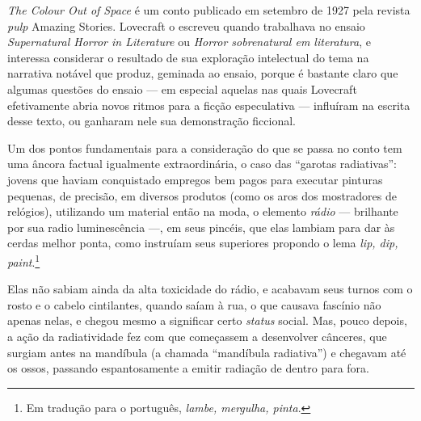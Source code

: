 \textit{The Colour Out of Space} é um conto publicado em setembro de 1927
pela revista \textit{pulp} Amazing Stories. Lovecraft o escreveu quando
trabalhava no ensaio \textit{Supernatural Horror in Literature} ou \textit{Horror
sobrenatural em literatura}, e interessa considerar o resultado de sua
exploração intelectual do tema na narrativa notável que produz, geminada
ao ensaio, porque é bastante claro que algumas questões do ensaio --- em
especial aquelas nas quais Lovecraft efetivamente abria novos ritmos para
a ficção especulativa --- influíram na escrita desse texto, ou ganharam
nele sua demonstração ficcional.


Um dos pontos fundamentais para a consideração do que se passa no conto
tem uma âncora factual igualmente extraordinária, o caso das ``garotas
radiativas'': jovens que haviam conquistado empregos bem pagos para
executar pinturas pequenas, de precisão, em diversos produtos (como os
aros dos mostradores de relógios), utilizando um material então na moda,
o elemento \textit{rádio} --- brilhante por sua radio luminescência ---, em
seus pincéis, que elas lambiam para dar às cerdas melhor ponta, como
instruíam seus superiores propondo o lema \textit{lip, dip, paint}.\footnote{Em tradução para o português, \textit{lambe, mergulha, pinta}.}

Elas não sabiam ainda da alta toxicidade do rádio, e acabavam seus
turnos com o rosto e o cabelo cintilantes, quando saíam à rua, o que
causava fascínio não apenas nelas, e chegou mesmo a significar certo
\textit{status} social. Mas, pouco depois, a ação da radiatividade fez com
que começassem a desenvolver cânceres, que surgiam antes na mandíbula (a
chamada ``mandíbula radiativa'') e chegavam até os ossos, passando
espantosamente a emitir radiação de dentro para fora.

